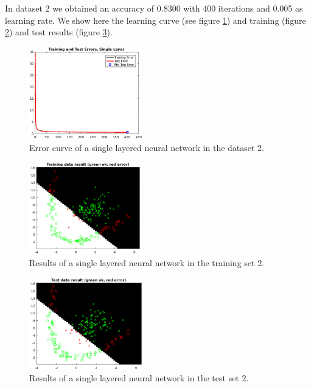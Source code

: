 \documentclass{article}
\begin{document}
In dataset 2 we obtained an accuracy of 0.8300 with 400 iterations and 0.005 as learning rate. We show here the learning curve (see figure \ref{fig:single_data2_error}) and training (figure \ref{fig:single_data2_result_train}) and test results (figure \ref{fig:single_data2_result_test}).

\begin{figure}[!htb]
\centering
\includegraphics[height=4cm]{images/single_data2_error}
\caption{Error curve of a single layered neural network in the dataset 2.}
\label{fig:single_data2_error}
\end{figure}

\begin{figure}[!htb]
\centering
\includegraphics[height=4cm]{images/single_data2_result_train}
\caption{Results of a single layered neural network in the training set 2.}
\label{fig:single_data2_result_train}
\end{figure}

\begin{figure}[!htb]
\centering
\includegraphics[height=4cm]{images/single_data2_result_test}
\caption{Results of a single layered neural network in the test set 2.}
\label{fig:single_data2_result_test}
\end{figure}
\end{document}
